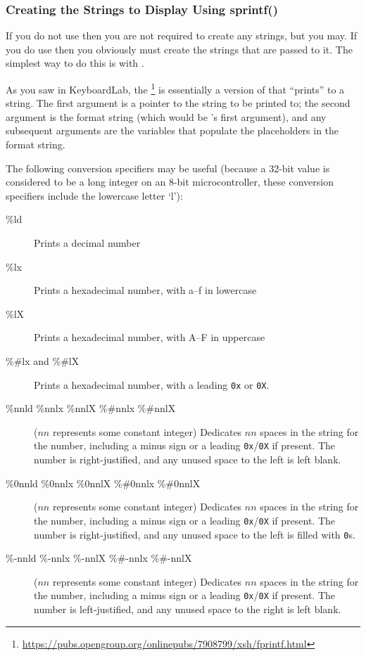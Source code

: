 \subsubsection{Creating the Strings to Display Using sprintf()}

If you do not use  then you are not required to create any strings, but you may.
If you do use  then you obviously must create the strings that are passed to it.
The simplest way to do this is with .

As you saw in KeyboardLab, the \footnote{\url{https://pubs.opengroup.org/onlinepubs/7908799/xsh/fprintf.html}} is essentially a version of  that ``prints'' to a string.
The first argument is a pointer to the string to be printed to; the second argument is the format string (which would be 's first argument), and any subsequent arguments are the variables that populate the placeholders in the format string.

The following conversion specifiers may be useful (because a 32-bit value is considered to be a long integer on an 8-bit microcontroller, these conversion specifiers include the lowercase letter `l'):
\begin{description}
    \item[\%ld] Prints a decimal number
    \item[\%lx] Prints a hexadecimal number, with a--f in lowercase
    \item[\%lX] Prints a hexadecimal number, with A--F in uppercase
    \item[\%\#lx and \%\#lX] Prints a hexadecimal number, with a leading \lstinline{0x} or \lstinline{0X}.
    \item[\%nnld \%nnlx \%nnlX \%\#nnlx \%\#nnlX] ($nn$ represents some constant integer) Dedicates $nn$ spaces in the string for the number, including a minus sign or a leading \lstinline{0x}/\lstinline{0X} if present.
        The number is right-justified, and any unused space to the left is left blank.
    \item[\%0nnld \%0nnlx \%0nnlX \%\#0nnlx \%\#0nnlX] ($nn$ represents some constant integer) Dedicates $nn$ spaces in the string for the number, including a minus sign or a leading \lstinline{0x}/\lstinline{0X} if present.
        The number is right-justified, and any unused space to the left is filled with \lstinline{0}s.
    \item[\%-nnld \%-nnlx \%-nnlX \%\#-nnlx \%\#-nnlX] ($nn$ represents some constant integer) Dedicates $nn$ spaces in the string for the number, including a minus sign or a leading \lstinline{0x}/\lstinline{0X} if present.
        The number is left-justified, and any unused space to the right is left blank.
\end{description}

